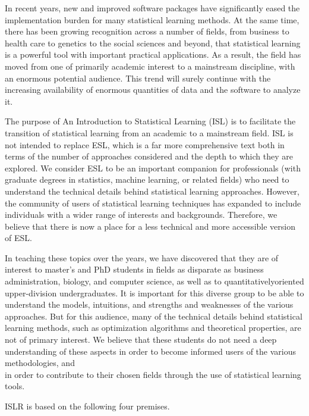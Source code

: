 \documentclass[10pt]{article}
\begin{document}
In recent years, new and improved software packages have significantly eased the implementation burden for many statistical learning methods. At the same time, there has been growing recognition across a number of fields, from business to health care to genetics to the social sciences and beyond, that statistical learning is a powerful tool with important practical applications. As a result, the field has moved from one of primarily academic interest to a mainstream discipline, with an enormous potential audience. This trend will surely continue with the increasing availability of enormous quantities of data and the software to analyze it.

The purpose of An Introduction to Statistical Learning (ISL) is to facilitate the transition of statistical learning from an academic to a mainstream field. ISL is not intended to replace ESL, which is a far more comprehensive text both in terms of the number of approaches considered and the depth to which they are explored. We consider ESL to be an important companion for professionals (with graduate degrees in statistics, machine learning, or related fields) who need to understand the technical details behind statistical learning approaches. However, the community of users of statistical learning techniques has expanded to include individuals with a wider range of interests and backgrounds. Therefore, we believe that there is now a place for a less technical and more accessible version of ESL.

In teaching these topics over the years, we have discovered that they are of interest to master's and PhD students in fields as disparate as business administration, biology, and computer science, as well as to quantitativelyoriented upper-division undergraduates. It is important for this diverse group to be able to understand the models, intuitions, and strengths and weaknesses of the various approaches. But for this audience, many of the technical details behind statistical learning methods, such as optimization algorithms and theoretical properties, are not of primary interest. We believe that these students do not need a deep understanding of these aspects in order to become informed users of the various methodologies, and\\
in order to contribute to their chosen fields through the use of statistical learning tools.

ISLR is based on the following four premises.
\end{document}
